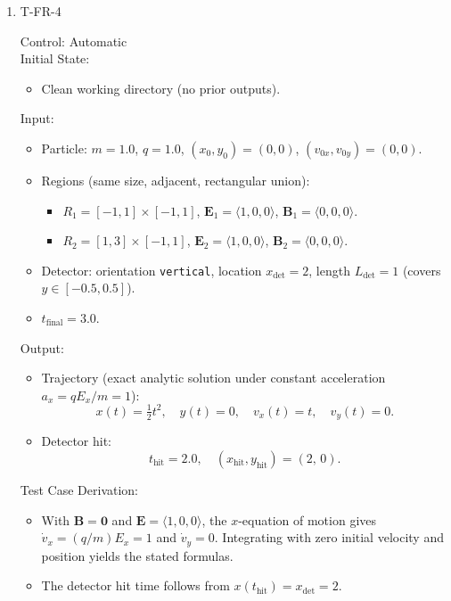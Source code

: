 \documentclass[12pt, titlepage]{article}
\begin{document}
\begin{enumerate}

\item{T-FR-4\\}

Control: Automatic\\

Initial State:
\begin{itemize}
  \item Clean working directory (no prior outputs).
\end{itemize}

Input:
\begin{itemize}
  \item Particle: $m = 1.0$, $q = 1.0$, $(x_0,y_0)=(0,0)$, $(v_{0x},v_{0y})=(0,0)$.
  \item Regions (same size, adjacent, rectangular union):
  \begin{itemize}
    \item $R_1=[-1,1]\times[-1,1]$,
    $\mathbf{E}_1=\langle 1,0,0\rangle$, $\mathbf{B}_1=\langle 0,0,0\rangle$.
    \item $R_2=[1,3]\times[-1,1]$,
    $\mathbf{E}_2=\langle 1,0,0\rangle$, $\mathbf{B}_2=\langle 0,0,0\rangle$.
  \end{itemize}
  \item Detector: orientation \texttt{vertical}, location $x_{\mathrm{det}}=2$,
  length $L_{\mathrm{det}}=1$ (covers $y\in[-0.5,0.5]$).
  \item $t_{\text{final}}=3.0$.
\end{itemize}

Output:
\begin{itemize}
  \item Trajectory (exact analytic solution under constant acceleration
        $a_x = qE_x/m = 1$):
  \[
    x(t)=\tfrac{1}{2}t^2,\quad y(t)=0,\quad v_x(t)=t,\quad v_y(t)=0.
  \]
  \item Detector hit:
  \[
    t_{\mathrm{hit}} = 2.0,\quad (x_{\mathrm{hit}},y_{\mathrm{hit}})=(2,\,0).
  \]
\end{itemize}

Test Case Derivation:
\begin{itemize}
  \item With $\mathbf{B}=\mathbf{0}$ and $\mathbf{E}=\langle 1,0,0\rangle$, the
        $x$-equation of motion gives $\dot{v}_x = (q/m)E_x = 1$ and
        $\dot{v}_y = 0$.  Integrating with zero initial velocity and position
        yields the stated formulas.
  \item The detector hit time follows from $x(t_{\mathrm{hit}})=x_{\mathrm{det}}=2$.
\end{itemize}


\end{enumerate}
\end{document}
